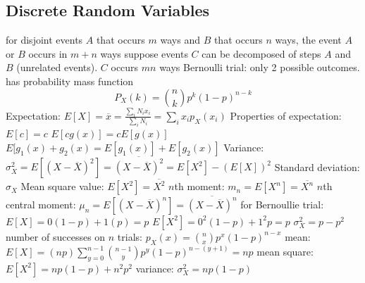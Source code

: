 \documentclass[a4paper,11pt]{article}
\begin{document}
	\subsection{Discrete Random Variables}
	\begin{outline}[enumerate]
		\1 for disjoint events $A$ that occurs $m$ ways and $B$ that occurs $n$ ways, the event $A$ or $B$ occurs in $m + n$ ways 
		\1 suppose events $C$ can be decomposed of steps $A$ and $B$ (unrelated events). $C$ occurs $mn$ ways
		\1 Bernoulli trial: only 2 possible outcomes. has probability mass function 
		\begin{equation}
			P_{X}(k) = \binom{n}{k}p^{k}\left(1 - p\right)^{n - k}
		\end{equation}
		\1 Expectation: $E\left[X\right] = \overline{x} = \frac{\sum_{i} N_{i}x_{i}}{\sum_{i} N_{i}} = \sum_{i} x_{i}p_{X}(x_{i})$
		\1 Properties of expectation:
			\2 $E[c] = c$
			\2 $E[cg(x)] = cE[g(x)]$
			\2 $E[g_{1}(x) + g_{2}(x) = E[g_{1}(x)] + E[g_{2}(x)]$
		\1 Variance: $\sigma_{X}^2 = E\left[\left(X - \overline{X}\right)^{2}\right] = \overline{\left(X - \overline{X}\right)^{2}} = E\left[X^{2}\right] - \left(E\left[X\right]\right)^{2}$ 	
		\1 Standard deviation: $\sigma_{X}$
		\1 Mean square value: $E[X^{2}] = \overline{X^{2}}$
		\1 $n$th moment: $m_{n} = E\left[X^{n}\right] = \overline{X^{n}}$
		\1 $n$th central moment: $\mu_{n} = E\left[\left(X - \overline{X}\right)^{n}\right] = \overline{\left(X - \overline{X}\right)^{n}}$	
		\1 for Bernoullie trial:
			\2 $E\left[X\right] = 0(1 - p) + 1(p) = p$
			\2 $E\left[X^{2}\right] = 0^{2}(1 - p) + 1^{2}p = p$
			\2 $\sigma_{X}^{2} = p - p^{2}$
			\2 number of successes on $n$ trials: $p_{X}(x) = \binom{n}{x}p^{x}\left(1 - p\right)^{n - x}$
			\2 mean: $E\left[X\right] = (np)\sum\limits_{y = 0}^{n - 1} \binom{n - 1}{y}p^y\left(1 - p\right)^{n - \left(y + 1\right)} = np$
			\2 mean square: $E\left[X^{2}\right] = np\left(1 - p\right) + n^{2}p^{2}$
			\2 variance: $\sigma_{X}^{2} = np\left(1 - p\right)$
	\end{outline}
\end{document}
